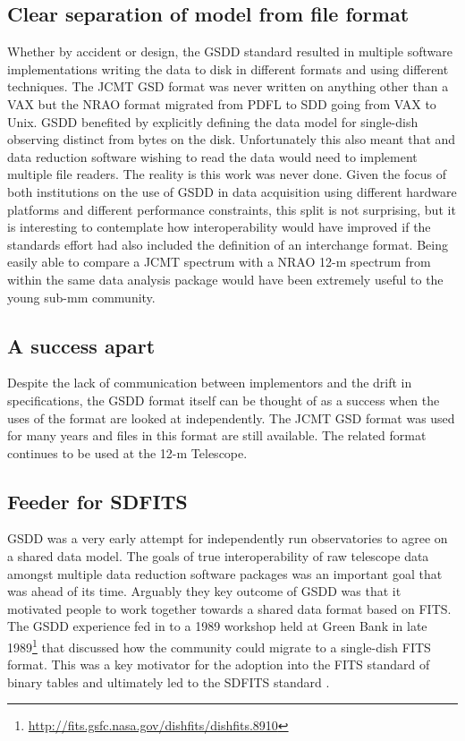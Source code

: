 \documentclass[final,authoryear,5p,times,twocolumn]{elsarticle}
\begin{document}
\subsection{Clear separation of model from file format}

Whether by accident or design, the GSDD standard resulted in multiple
software implementations writing the data to disk in different formats
and using different techniques. The JCMT GSD format was never written
on anything other than a VAX but the NRAO format migrated from PDFL to
SDD going from VAX to Unix. GSDD benefited by explicitly defining the
data model for single-dish observing distinct from bytes on the
disk. Unfortunately this also meant that and data reduction software
wishing to read the data would need to implement multiple file
readers. The reality is this work was never done. Given the focus of
both institutions on the use of GSDD in data acquisition using
different hardware platforms and different performance constraints,
this split is not surprising, but it is interesting to contemplate how
interoperability would have improved if the standards effort had also
included the definition of an interchange format. Being easily able to
compare a JCMT spectrum with a NRAO 12-m spectrum from within the same
data analysis package would have been extremely useful to the young
sub-mm community.

\subsection{A success apart}

Despite the lack of communication between implementors and the drift
in specifications, the GSDD format itself can be thought of as a
success when the uses of the format are looked at independently. The JCMT GSD
format was used for many years and files in this format are still
available. The related format continues to be used at the 12-m Telescope.


\subsection{Feeder for SDFITS}
\label{sec:sdfits}

GSDD was a very early attempt for independently run observatories to
agree on a shared data model. The goals of true interoperability of
raw telescope data amongst multiple data reduction software packages
was an important goal that was ahead of its time. Arguably they key
outcome of GSDD was that it motivated people to work together towards
a shared data format based on FITS. The GSDD experience fed in to a
1989 workshop held at Green Bank in late
1989\footnote{\url{http://fits.gsfc.nasa.gov/dishfits/dishfits.8910}}
that discussed how the community could migrate to a
single-dish FITS format. This was a key motivator for the adoption
into the FITS standard of binary tables \citep{1995A&AS..113..159C}
and ultimately led to the SDFITS standard \citep{2000ASPC..216..243G}.
\end{document}
